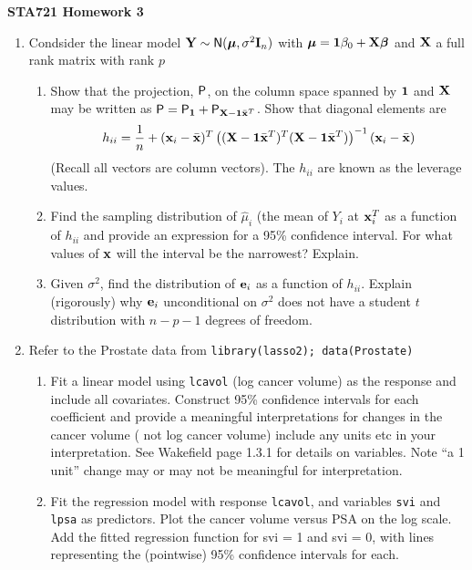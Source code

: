 \documentclass[12pt]{article}
\begin{document}
{\bf STA721 \hfill Homework 3}

\vspace{.5in}


\begin{enumerate}
\item Condsider the linear model $\Y \sim \N(\mub, \sigma^2 \I_n)$
  with  $\mub = \one \beta_0 + \X \b$ and $\X$ a full rank matrix with rank $p$
  \begin{enumerate}
  \item 

    Show that the projection, $\P$, on the column space spanned by
    $\one$ and $\X$ may be written as
    $\P = \P_{\one} + \P_{\X - \one \xbar^T}$.  Show that diagonal
    elements are
    $$h_{ii} = \frac{1}{n} + (\x_i-\xbar)^T\left((\X- \one \xbar^T)^T(\X - \one
    \xbar^T)\right)^{-1}(\x_i - \xbar)$$
    (Recall all vectors are column vectors).  The $h_{ii}$ are known
    as the leverage values.
\item Find the sampling distribution of $\hat{\mu}_i$ (the mean
  of  $Y_i$ at $\x_i^T$ as a function of $h_{ii}$ and provide an
  expression for a 95\% confidence interval.   For what values of $\x$
  will the interval be the narrowest? Explain.

\item Given $\sigma^2$, find the distribution of $\e_i$ as a function
  of $h_{ii}$.  Explain (rigorously) why $\e_i$ unconditional on
    $\sigma^2$ does not have a student $t$ distribution with
    $n - p - 1$ degrees of freedom.
\end{enumerate}
\item  Refer to the Prostate data  from {\tt library(lasso2); data(Prostate)}
\begin{enumerate}

\item Fit a linear model using {\tt lcavol} (log
  cancer volume) as the response and include all covariates.
  Construct 95\% confidence intervals for 
  each coefficient and provide a meaningful interpretations for
  changes in the  cancer volume  ( not log cancer volume) include any
  units etc in your interpretation.   See Wakefield page 1.3.1 for
  details on variables.  Note ``a 1 unit'' change may or may not be
  meaningful for interpretation.   
\item Fit the regression model with
  response {\tt lcavol}, and variables {\tt svi} and {\tt lpsa} as
  predictors.  Plot the cancer volume versus PSA on the log scale. Add
  the fitted regression function for svi = 1 and svi = 0, with
  lines representing the (pointwise) 95\%  confidence intervals for each. 
\end{enumerate}

\end{enumerate}
\end{document}
